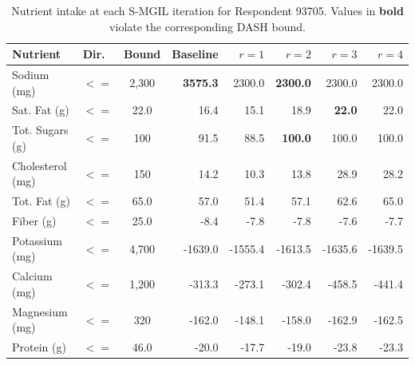 \begin{table}[htbp]
\centering
\caption{Nutrient intake at each S-MGIL iteration for Respondent 93705. Values in \textbf{bold} violate the corresponding DASH bound.}
\label{tab:nutrient_intake}
\footnotesize
\begin{tabular}{llcrrrrr}
\toprule
Nutrient & Dir. & Bound & Baseline & $r=1$ & $r=2$ & $r=3$ & $r=4$ \\
\midrule
Sodium (mg) & $<=$ & 2,300 & \textbf{3575.3} & 2300.0 & \textbf{2300.0} & 2300.0 & 2300.0 \\
Sat. Fat (g) & $<=$ & 22.0 & 16.4 & 15.1 & 18.9 & \textbf{22.0} & 22.0 \\
Tot. Sugars (g) & $<=$ & 100 & 91.5 & 88.5 & \textbf{100.0} & 100.0 & 100.0 \\
Cholesterol (mg) & $<=$ & 150 & 14.2 & 10.3 & 13.8 & 28.9 & 28.2 \\
Tot. Fat (g) & $<=$ & 65.0 & 57.0 & 51.4 & 57.1 & 62.6 & 65.0 \\
Fiber (g) & $<=$ & 25.0 & -8.4 & -7.8 & -7.8 & -7.6 & -7.7 \\
Potassium (mg) & $<=$ & 4,700 & -1639.0 & -1555.4 & -1613.5 & -1635.6 & -1639.5 \\
Calcium (mg) & $<=$ & 1,200 & -313.3 & -273.1 & -302.4 & -458.5 & -441.4 \\
Magnesium (mg) & $<=$ & 320 & -162.0 & -148.1 & -158.0 & -162.9 & -162.5 \\
Protein (g) & $<=$ & 46.0 & -20.0 & -17.7 & -19.0 & -23.8 & -23.3 \\
\bottomrule
\end{tabular}
\end{table}